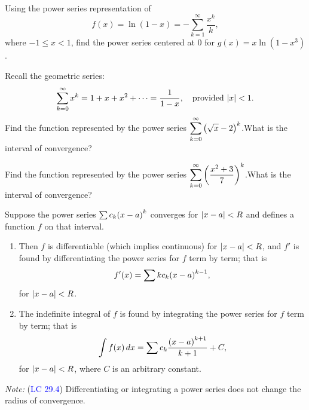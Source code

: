\documentclass[../mathNotesPreamble]{subfiles}
\begin{document}
  \begin{ex*}[\textcolor{blue}{LC 29.1}]
    Using the power series representation of 
      \[f(x)=\ln(1-x)=-\sum_{k=1}^\infty \frac{x^k}{k},\]
    where $-1\leq x<1$, find the power series centered at $0$ for $g(x)=x\ln(1-x^3)$.
  \end{ex*}
  \pagebreak

  \begin{ex*}[\textcolor{blue}{LC 29.2-29.3}]
    Recall the geometric series:
      \[\sum_{k=0}^\infty x^k=1+x+x^2+\dots=\frac{1}{1-x},\quad\textnormal{provided } {\left\vert x\right\vert}<1.\]
    Find the function represented by the power series $\displaystyle\sum_{k=0}^\infty {\left(\sqrt{x}-2\right)}^k$.\newline What is the interval of convergence?
  \end{ex*}
  \pagebreak

  \begin{ex*}
    Find the function represented by the power series $\displaystyle\sum_{k=0}^\infty {\left(\frac{x^2+3}{7}\right)}^k$.\newline What is the interval of convergence?
  \end{ex*}
  \pagebreak

  \begin{thmBox*}
    Suppose the power series $\sum c_k{\left(x-a\right)}^k$ converges for ${\left\vert x-a\right\vert}<R$ and defines a function $f$ on that interval.
    \begin{enumerate}
      \item Then $f$ is differentiable (which implies continuous) for ${\left\vert x-a\right\vert}<R$, and $f'$ is found by differentiating the power series for $f$ term by term; that is
          \[f'(x)=\sum kc_k{\left(x-a\right)}^{k-1},\]
        for ${\left\vert x-a\right\vert}<R$.
      \item The indefinite integral of $f$ is found by integrating the power series for $f$ term by term; that is
          \[\int f(x)\,dx= \sum c_k \frac{{\left(x-a\right)}^{k+1}}{k+1}+C,\]
        for ${\left\vert x-a\right\vert}<R$, where $C$ is an arbitrary constant.
    \end{enumerate}
  \end{thmBox*}
  \noindent \textit{Note:} (\textcolor{blue}{LC 29.4}) Differentiating or integrating a power series does not change the radius of convergence.
\end{document}
